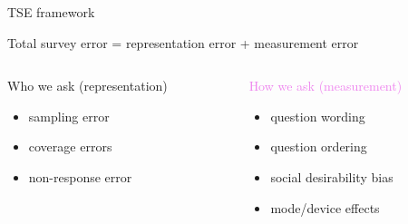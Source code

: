 \documentclass[aspectratio=169]{beamer}
\begin{document}
\begin{frame}{TSE framework}

Total survey error = representation error + measurement error
\vspace{1em}

\begin{columns}[T]

\begin{column}{0.45\textwidth}
Who we ask (representation)\\
\begin{itemize}
\item sampling error
\item coverage errors
\item non-response error
\end{itemize}
\end{column}

\begin{column}{0.45\textwidth}
\textcolor{violet}{How we ask (measurement)}\\
\begin{itemize}
\item question wording
\item question ordering
\item social desirability bias
\item mode/device effects
\end{itemize}
\end{column}

\end{columns}

\end{frame}
\end{document}
